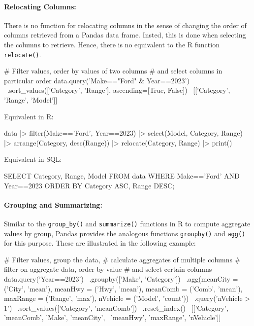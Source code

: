 \paragraph*{Relocating Columns:} There is no function for relocating columns in the sense of changing the order of columns retrieved from a Pandas data frame. Insted, this is done when selecting the columns to retrieve. Hence, there is no equivalent to the R function \texttt{relocate()}.

\begin{pythoncode}
# Filter values, order by values of two columns
# and select columns in particular order
data.query('Make=="Ford" & Year==2023') \
    .sort_values(['Category', 'Range'], ascending=[True, False]) \
    [['Category', 'Range', 'Model']]
\end{pythoncode}

\begin{multicols}{2}

Equivalent in R:

\begin{Rcode}
data |> 
  filter(Make=='Ford', 
         Year==2023) |> 
  select(Model, Category, 
         Range) |>
  arrange(Category, 
          desc(Range)) |>
  relocate(Category, Range) |>
  print()
\end{Rcode}

Equivalent in SQL:

\begin{sqlcode}
SELECT Category, Range, Model
   FROM data 
   WHERE Make=='Ford' AND 
         Year==2023
   ORDER BY Category ASC, 
            Range DESC;
\end{sqlcode}
\end{multicols}

\paragraph*{Grouping and Summarizing:} Similar to the \texttt{group\_by()} and \texttt{summarize()} functions in R to compute aggregate values by group, Pandas provides the analogous functions \texttt{groupby()} and \texttt{agg()} for this purpose. These are illustrated in the following example:

\begin{pythoncode}
# Filter values, group the data,
# calculate aggregates of multiple columns
# filter on aggregate data, order by value
# and select certain columns
data.query('Year==2023') \
    .groupby(['Make', 'Category']) \
    .agg(meanCity = ('City', 'mean'),
         meanHwy = ('Hwy', 'mean'),
         meanComb = ('Comb', 'mean'),
         maxRange = ('Range', 'max'),
         nVehicle = ('Model', 'count')) \
    .query('nVehicle > 1') \
    .sort_values(['Category', 'meanComb']) \
    .reset_index() \
    [['Category', 'meanComb', 'Make', 'meanCity', \
      'meanHwy', 'maxRange', 'nVehicle']]
\end{pythoncode}

